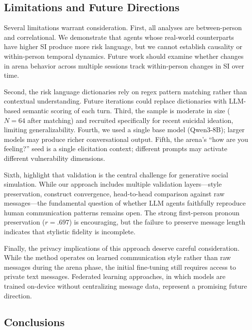 \documentclass[review,12pt,authoryear]{elsarticle}
\begin{document}
\subsection{Limitations and Future Directions}

Several limitations warrant consideration. First, all analyses are between-person and correlational. We demonstrate that agents whose real-world counterparts have higher SI produce more risk language, but we cannot establish causality or within-person temporal dynamics. Future work should examine whether changes in arena behavior across multiple sessions track within-person changes in SI over time.

Second, the risk language dictionaries rely on regex pattern matching rather than contextual understanding. Future iterations could replace dictionaries with LLM-based semantic scoring of each turn. Third, the sample is moderate in size ($N = 64$ after matching) and recruited specifically for recent suicidal ideation, limiting generalizability. Fourth, we used a single base model (Qwen3-8B); larger models may produce richer conversational output. Fifth, the arena's ``how are you feeling?'' seed is a single elicitation context; different prompts may activate different vulnerability dimensions.

Sixth, \citet{tornberg2025validation} highlight that validation is the central challenge for generative social simulation. While our approach includes multiple validation layers---style preservation, construct convergence, head-to-head comparison against raw messages---the fundamental question of whether LLM agents faithfully reproduce human communication patterns remains open. The strong first-person pronoun preservation ($r = .697$) is encouraging, but the failure to preserve message length indicates that stylistic fidelity is incomplete.

Finally, the privacy implications of this approach deserve careful consideration. While the method operates on learned communication style rather than raw messages during the arena phase, the initial fine-tuning still requires access to private text messages. Federated learning approaches, in which models are trained on-device without centralizing message data, represent a promising future direction.

\subsection{Conclusions}
\end{document}
